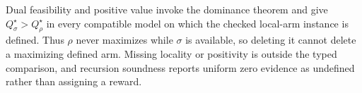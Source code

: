 Dual feasibility and positive value invoke the dominance theorem and give \(Q_\sigma^\star>Q_\rho^\star\) in every compatible model on which the checked local-arm instance is defined.  Thus \(\rho\) never maximizes while \(\sigma\) is available, so deleting it cannot delete a maximizing defined arm.  Missing locality or positivity is outside the typed comparison, and recursion soundness reports uniform zero evidence as undefined rather than assigning a reward.